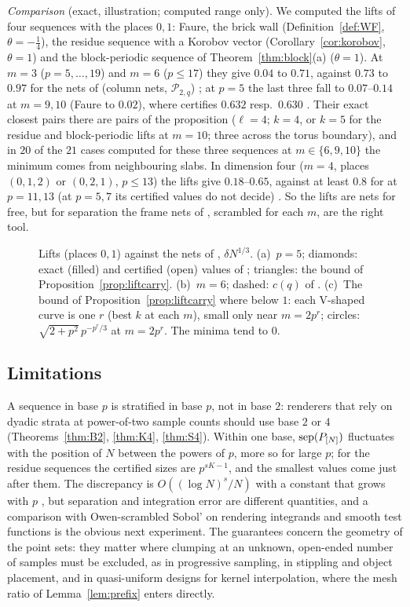 \emph{Comparison} (exact, illustration; computed range only). We computed the lifts of four sequences with the places $0,1$: Faure, the brick wall (Definition~\ref{def:WF}, $\theta=-\frac14$), the residue sequence with a Korobov vector (Corollary~\ref{cor:korobov}, $\theta=1$) and the block-periodic sequence of Theorem~\ref{thm:block}(a) ($\theta=1$). At $m=3$ ($p=5,\dots,19$) and $m=6$ ($p\le17$) they give $0.04$ to $0.71$, against $0.73$ to $0.97$ for the nets of \cite{Gru26geo} (column nets, $\mathcal P_{2,q}$)%
; at $p=5$ the last three fall to $0.07$--$0.14$ at $m=9,10$ (Faure to $0.02$), where \cite{Gru26geo} certifies $0.632$ resp.\ $0.630$%
. Their exact closest pairs there are pairs of the proposition ($\ell=4$; $k=4$, or $k=5$ for the residue and block-periodic lifts at $m=10$; three across the torus boundary), and in $20$ of the $21$ cases computed for these three sequences at $m\in\{6,9,10\}$ the minimum comes from neighbouring slabs. In dimension four ($m=4$, places $(0,1,2)$ or $(0,2,1)$, $p\le13$) the lifts give $0.18$--$0.65$, against at least $0.8$ for \cite{Gru26geo} at $p=11,13$ (at $p=5,7$ its certified values do not decide)%
. So the lifts are nets for free, but for separation the frame nets of \cite{Gru26geo}, scrambled for each $m$, are the right tool.

\begin{figure}[t]
\centering
{}
\caption{Lifts (places $0,1$) against the nets of \cite{Gru26geo}, $\delta N^{1/3}$. (a)~$p=5$; diamonds: exact (filled) and certified (open) values of \cite{Gru26geo}; triangles: the bound of Proposition~\ref{prop:liftcarry}. (b)~$m=6$; dashed: $c(q)$ of \cite{Gru26geo}. (c)~The bound of Proposition~\ref{prop:liftcarry} where below $1$: each V-shaped curve is one $r$ (best $k$ at each $m$), small only near $m=2p^r$; circles: $\sqrt{2+p^2}\,p^{-p^r/3}$ at $m=2p^r$. The minima tend to $0$.}
\label{fig:hammersley}
\end{figure}

\subsection{Limitations}
A sequence in base $p$ is stratified in base $p$, not in base $2$: renderers that rely on dyadic strata at power-of-two sample counts should use base $2$ or $4$ (Theorems~\ref{thm:B2}, \ref{thm:K4}, \ref{thm:S4}). Within one base, $\operatorname{sep}(P_{[N]})$ fluctuates with the position of $N$ between the powers of $p$, more so for large $p$; for the residue sequences the certified sizes are $p^{sK-1}$, and the smallest values come just after them. The discrepancy is $O((\log N)^s/N)$ with a constant that grows with $p$ \cite{Nie92}, but separation and integration error are different quantities, and a comparison with Owen-scrambled Sobol' on rendering integrands and smooth test functions is the obvious next experiment. The guarantees concern the geometry of the point sets: they matter where clumping at an unknown, open-ended number of samples must be excluded, as in progressive sampling, in stippling and object placement, and in quasi-uniform designs for kernel interpolation, where the mesh ratio of Lemma~\ref{lem:prefix} enters directly.
